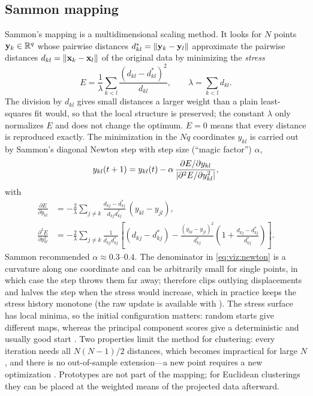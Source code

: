 \subsection{Sammon mapping}\label{sec:viz:sammon}

Sammon's mapping \cite{sammon:1969} is a multidimensional scaling method. It looks for $N$ points $\mathbf{y}_k\in\mathbb{R}^q$ whose pairwise distances $d^*_{kl}=\left\lVert \mathbf{y}_k-\mathbf{y}_l \right\rVert$ approximate the pairwise distances $d_{kl}=\left\lVert \mathbf{x}_k-\mathbf{x}_l \right\rVert$ of the original data by minimizing the \emph{stress}
\begin{equation}
  E = \frac{1}{\lambda}\sum_{k<l}\frac{(d_{kl}-d^*_{kl})^2}{d_{kl}},\qquad \lambda=\sum_{k<l}d_{kl}.
  \label{eq:viz:stress}
\end{equation}
The division by $d_{kl}$ gives small distances a larger weight than a plain least-squares fit would, so that the local structure is preserved; the constant $\lambda$ only normalizes $E$ and does not change the optimum. $E=0$ means that every distance is reproduced exactly. The minimization in the $Nq$ coordinates $y_{kl}$ is carried out by Sammon's diagonal Newton step with step size (``magic factor'') $\alpha$,
\begin{equation}
  y_{kl}(t+1) = y_{kl}(t) - \alpha\,\frac{\partial E/\partial y_{kl}}{\left\lvert \partial^2E/\partial y_{kl}^2 \right\rvert},
  \label{eq:viz:newton}
\end{equation}
with
\begin{align}
  \frac{\partial E}{\partial y_{kl}} &= -\frac{2}{\lambda}\sum_{j\ne k}\frac{d_{kj}-d^*_{kj}}{d_{kj}d^*_{kj}}\,(y_{kl}-y_{jl}),\label{eq:viz:grad}\\
  \frac{\partial^2E}{\partial y_{kl}^2} &= -\frac{2}{\lambda}\sum_{j\ne k}\frac{1}{d_{kj}d^*_{kj}}\left[(d_{kj}-d^*_{kj})-\frac{(y_{kl}-y_{jl})^2}{d^*_{kj}}\left(1+\frac{d_{kj}-d^*_{kj}}{d^*_{kj}}\right)\right].\label{eq:viz:hess}
\end{align}
Sammon recommended $\alpha\approx0.3$--$0.4$. The denominator in \eqref{eq:viz:newton} is a curvature along one coordinate and can be arbitrarily small for single points, in which case the step throws them far away;  therefore clips outlying displacements and halves the step when the stress would increase, which in practice keeps the stress history monotone (the raw update is available with ). The stress surface has local minima, so the initial configuration matters: random starts give different maps, whereas the principal component scores give a deterministic and usually good start \cite{mao:1995}. Two properties limit the method for clustering: every iteration needs all $N(N-1)/2$ distances, which becomes impractical for large $N$ \cite{deridder:1997}, and there is no out-of-sample extension---a new point requires a new optimization \cite{pal:1998}. Prototypes are not part of the mapping; for Euclidean clusterings they can be placed at the weighted means of the projected data afterward.

